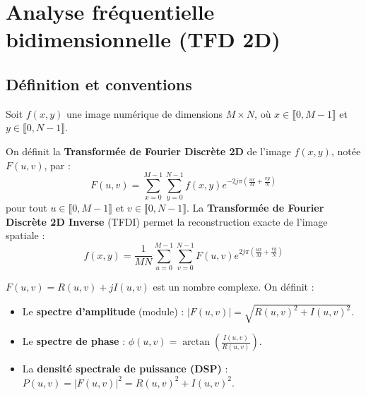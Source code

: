 \minitoc 


\section{Analyse fréquentielle bidimensionnelle (TFD 2D)}

\subsection{Définition et conventions}

Soit $f(x,y)$ une image numérique de dimensions $M \times N$, où $x \in \llbracket 0, M-1 \rrbracket$ et $y \in \llbracket 0, N-1 \rrbracket$.

\begin{definition}
    On définit la \textbf{Transformée de Fourier Discrète 2D} de l'image $f(x,y)$, notée $F(u,v)$, par :
        \begin{equation}
            \boxed{F(u,v) = \sum_{x=0}^{M-1} \sum_{y=0}^{N-1} f(x,y) e^{-2j \pi \left( \frac{ux}{M} + \frac{vy}{N} \right)}}
        \end{equation}
    pour tout $u \in \llbracket 0, M-1 \rrbracket$ et $v \in \llbracket 0, N-1 \rrbracket$. 
    La \textbf{Transformée de Fourier Discrète 2D Inverse} (TFDI) permet la reconstruction exacte de l'image spatiale :
        \begin{equation}
            \boxed{f(x,y) = \frac{1}{MN} \sum_{u=0}^{M-1} \sum_{v=0}^{N-1} F(u,v) e^{2j \pi \left( \frac{ux}{M} + \frac{vy}{N} \right)}}
        \end{equation}
\end{definition}

\begin{proposition}
    $F(u,v) = R(u,v) + j I(u,v)$ est un nombre complexe. On définit :
    \begin{itemize}
        \item Le \textbf{spectre d'amplitude} (module) : $|F(u,v)| = \sqrt{R(u,v)^2 + I(u,v)^2}$.
        \item Le \textbf{spectre de phase} : $\phi(u,v) = \operatorname{arctan}\left(\frac{I(u,v)}{R(u,v)}\right)$.
        \item La \textbf{densité spectrale de puissance (DSP)} : $P(u,v) = |F(u,v)|^2 = R(u,v)^2 + I(u,v)^2$.
    \end{itemize}
\end{proposition}

